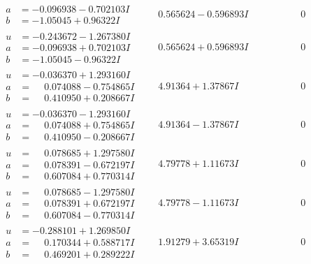 \documentclass[1p]{elsarticle_modified}
\theoremstyle{definition}
\begin{document}
$$\begin{array}{c|c|c}
\begin{aligned}
a &= -0.096938 - 0.702103 I \\
b &= -1.05045 + 0.96322 I\end{aligned}
 & \phantom{-}0.565624 - 0.596893 I & \phantom{-0.000000 } 0 \\ \hline\begin{aligned}
u &= -0.243672 - 1.267380 I \\
a &= -0.096938 + 0.702103 I \\
b &= -1.05045 - 0.96322 I\end{aligned}
 & \phantom{-}0.565624 + 0.596893 I & \phantom{-0.000000 } 0 \\ \hline\begin{aligned}
u &= -0.036370 + 1.293160 I \\
a &= \phantom{-}0.074088 - 0.754865 I \\
b &= \phantom{-}0.410950 + 0.208667 I\end{aligned}
 & \phantom{-}4.91364 + 1.37867 I & \phantom{-0.000000 } 0 \\ \hline\begin{aligned}
u &= -0.036370 - 1.293160 I \\
a &= \phantom{-}0.074088 + 0.754865 I \\
b &= \phantom{-}0.410950 - 0.208667 I\end{aligned}
 & \phantom{-}4.91364 - 1.37867 I & \phantom{-0.000000 } 0 \\ \hline\begin{aligned}
u &= \phantom{-}0.078685 + 1.297580 I \\
a &= \phantom{-}0.078391 - 0.672197 I \\
b &= \phantom{-}0.607084 + 0.770314 I\end{aligned}
 & \phantom{-}4.79778 + 1.11673 I & \phantom{-0.000000 } 0 \\ \hline\begin{aligned}
u &= \phantom{-}0.078685 - 1.297580 I \\
a &= \phantom{-}0.078391 + 0.672197 I \\
b &= \phantom{-}0.607084 - 0.770314 I\end{aligned}
 & \phantom{-}4.79778 - 1.11673 I & \phantom{-0.000000 } 0 \\ \hline\begin{aligned}
u &= -0.288101 + 1.269850 I \\
a &= \phantom{-}0.170344 + 0.588717 I \\
b &= \phantom{-}0.469201 + 0.289222 I\end{aligned}
 & \phantom{-}1.91279 + 3.65319 I & \phantom{-0.000000 } 0\\

\end{array}$$
\end{document}
